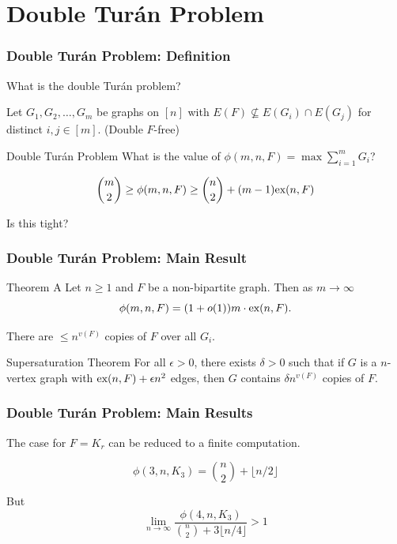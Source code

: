 \documentclass{beamer}
\newcommand*{\ex}{\textnormal{ex}}
\begin{document}
\section{Double Turán Problem}

\begin{frame}
\frametitle{Double Turán Problem: Definition}

What is the double Turán problem? \pause

\vspace{0.5cm}

Let $G_1, G_2, \ldots, G_m$ be graphs on $[n]$ with $E(F) \not\subseteq E(G_i) \cap E(G_j)$ for distinct $i, j \in [m]$. \pause (\alert{Double $F$-free})

\pause

\begin{block}{Double Turán Problem}
  What is the value of $\phi(m, n, F) = \max \sum_{i = 1}^m G_i$?
\end{block}

\pause

\[
  \binom{m}{2} \geq \phi(m, n, F) \geq \binom{n}{2} + (m - 1)\ex(n, F)
\]

\pause

Is this tight?
\end{frame}

\begin{frame}
  \frametitle{Double Turán Problem: Main Result}

  \begin{block}{Theorem A}
    Let $n \geq 1$ and $F$ be a non-bipartite graph. Then as $m \to \infty$
    \[ 
      \phi(m, n, F) = (1 + o(1))m \cdot \ex(n, F).
    \]
  \end{block}

  \pause

  \vspace{0.3cm}

  There are $\leq n^{v(F)}$ copies of $F$ over all $G_i$.

  \pause

  \begin{block}{Supersaturation Theorem \cite{ErdosSimonovits1983}}
    For all $\epsilon > 0$, there exists $\delta > 0$ such that if $G$ is a $n$-vertex graph with $\ex(n,F) + \epsilon n^2$ edges, then  $G$ contains $\delta n^{v(F)}$ copies of $F$.
  \end{block}
\end{frame}

\begin{frame}
  \frametitle{Double Turán Problem: Main Results}

  The case for $F = K_r$ can be reduced to a finite computation.

  \pause

  \[
    \phi(3, n, K_3) = \binom{n}{2} + \lfloor n/2\rfloor
  \]

  \pause
  
  But 
  \[
    \lim_{n \to \infty} \frac{\phi(4, n, K_3)}{\binom{n}{2} + 3\lfloor n/4\rfloor} > 1
  \]
\end{frame}
\end{document}
